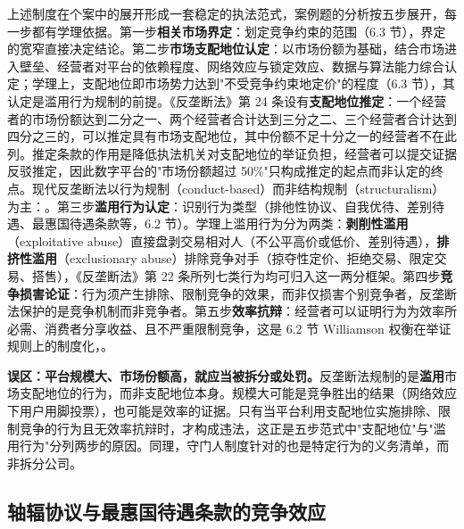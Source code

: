 上述制度在个案中的展开形成一套稳定的执法范式，案例题的分析按五步展开，每一步都有学理依据。第一步\textbf{相关市场界定}：划定竞争约束的范围（6.3 节），界定的宽窄直接决定结论。第二步\textbf{市场支配地位认定}：以市场份额为基础，结合市场进入壁垒、经营者对平台的依赖程度、网络效应与锁定效应、数据与算法能力综合认定；学理上，支配地位即市场势力达到"不受竞争约束地定价"的程度（6.3 节），其认定是滥用行为规制的前提。《反垄断法》第 24 条设有\textbf{支配地位推定}：一个经营者的市场份额达到二分之一、两个经营者合计达到三分之二、三个经营者合计达到四分之三的，可以推定具有市场支配地位，其中份额不足十分之一的经营者不在此列。推定条款的作用是降低执法机关对支配地位的举证负担，经营者可以提交证据反驳推定，因此数字平台的"市场份额超过 50\%"只构成推定的起点而非认定的终点。现代反垄断法以行为规制（conduct-based）而非结构规制（structuralism）为主：。第三步\textbf{滥用行为认定}：识别行为类型（排他性协议、自我优待、差别待遇、最惠国待遇条款等，6.2 节）。学理上滥用行为分为两类：\textbf{剥削性滥用}（exploitative abuse）直接盘剥交易相对人（不公平高价或低价、差别待遇），\textbf{排挤性滥用}（exclusionary abuse）排除竞争对手（掠夺性定价、拒绝交易、限定交易、搭售），《反垄断法》第 22 条所列七类行为均可归入这一两分框架。第四步\textbf{竞争损害论证}：行为须产生排除、限制竞争的效果，而非仅损害个别竞争者，反垄断法保护的是竞争机制而非竞争者。第五步\textbf{效率抗辩}：经营者可以证明行为为效率所必需、消费者分享收益、且不严重限制竞争，这是 6.2 节 Williamson 权衡在举证规则上的制度化，。

\begin{misconception}
\textbf{误区：平台规模大、市场份额高，就应当被拆分或处罚。}反垄断法规制的是\textbf{滥用}市场支配地位的行为，而非支配地位本身。规模大可能是竞争胜出的结果（网络效应下用户用脚投票），也可能是效率的证据。只有当平台利用支配地位实施排除、限制竞争的行为且无效率抗辩时，才构成违法，这正是五步范式中"支配地位"与"滥用行为"分列两步的原因。同理，守门人制度针对的也是特定行为的义务清单，而非拆分公司。
\end{misconception}

\subsection{轴辐协议与最惠国待遇条款的竞争效应}

